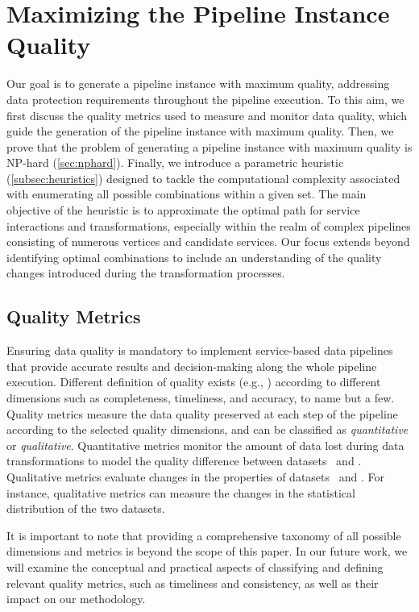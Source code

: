\section{Maximizing the Pipeline Instance Quality}\label{sec:heuristics}
Our goal is to generate a pipeline instance with maximum quality, addressing data protection requirements throughout the pipeline execution. To this aim, we first discuss the quality metrics used to measure and monitor data quality, which guide the generation of the pipeline instance with maximum quality. Then, we prove that the problem of generating a pipeline instance with maximum quality is NP-hard (\cref{sec:nphard}). Finally, we introduce a parametric heuristic (\cref{subsec:heuristics}) designed to tackle the computational complexity associated with enumerating all possible combinations within a given set. The main objective of the heuristic is to approximate the optimal path for service interactions and transformations, especially within the realm of complex pipelines consisting of numerous vertices and candidate services. Our focus extends beyond identifying optimal combinations to include an understanding of the quality changes introduced during the transformation processes.

\subsection{Quality Metrics}\label{subsec:metrics}
Ensuring data quality is mandatory to implement service-based data pipelines that provide accurate results and decision-making along the whole pipeline execution.
{\color{OurColor} Different definition of quality exists (e.g., \cite{Wang2023,surveyquality}) according to different dimensions such as completeness, timeliness, and accuracy, to name but a few. Quality metrics measure the data quality preserved at each step of the pipeline according to the selected quality dimensions, and can be classified as \emph{quantitative} or \emph{qualitative}.}
Quantitative metrics monitor the amount of data lost during data transformations to model the quality difference between datasets \origdataset\ and \transdataset.
Qualitative metrics evaluate changes in the properties of datasets \origdataset\ and \transdataset. For instance, qualitative metrics can measure the changes in the statistical distribution of the two datasets.

{\color{OurColor2}
It is important to note that providing a comprehensive taxonomy of all possible dimensions and metrics is beyond the scope of this paper. In our future work, we will examine the conceptual and practical aspects of classifying and defining relevant quality metrics, such as timeliness and consistency, as well as their impact on our methodology.
                  }

